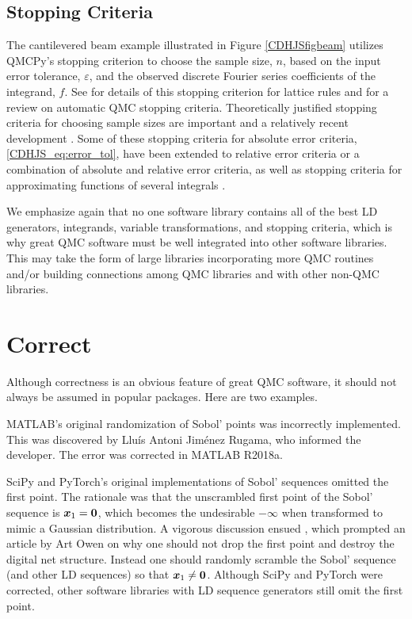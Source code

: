 \documentclass[graybox]{svmult}
\begin{document}
\subsection{Stopping Criteria}
The cantilevered beam example illustrated in Figure \ref{CDHJSfigbeam} utilizes QMCPy's stopping criterion to choose the sample size, $n$, based on the input error tolerance, $\varepsilon$, and the observed discrete Fourier series coefficients of the integrand, $f$.  See \cite{HicJim16a} for details of this stopping criterion for lattice rules and \cite{HicEtal18a} for a review on automatic QMC stopping criteria.  Theoretically justified stopping criteria for choosing sample sizes are important and a relatively recent development \cite{HicEtal14a,HicJim16a,JimHic16a,RatHic19a,JagHic22a}.  Some of these stopping criteria for absolute error criteria, \eqref{CDHJS_eq:error_tol},  have been extended to relative error criteria or a combination of absolute and relative error criteria, as well as stopping criteria for approximating functions of several integrals \cite{Jia16a,GilJim16b,HicEtal17a,JagSor23a}.

We emphasize again that no one software library contains all of the best LD generators, integrands, variable transformations, and stopping criteria, which is why great QMC software must be well integrated into other software libraries.  This may take the form of large libraries incorporating more QMC routines and/or building connections among QMC libraries and with other non-QMC libraries.


\section{Correct} \label{CDHJS_sec:correct}
Although correctness is an obvious feature of great QMC software, it should not always be assumed in popular packages.  Here are two examples.

MATLAB's original randomization of Sobol' points was incorrectly implemented.  This was discovered by Llu\'is Antoni Jim\'enez Rugama, who informed the developer.  The error was corrected in MATLAB R2018a.

SciPy and PyTorch's original implementations of Sobol' sequences omitted the first point.  The rationale was that the unscrambled first point of the Sobol' sequence is ${\boldsymbol{x}}_1 = {\boldsymbol{0}}$, which becomes the undesirable $\boldsymbol{-\infty}$ when transformed to mimic a Gaussian distribution.  A vigorous discussion ensued \cite{scipySobol2020a,pytorchSoboldiscussion2020a}, which prompted an article by Art Owen \cite{Owe22a} on why one should not drop the first point and destroy the digital net structure.  Instead one should randomly scramble the Sobol' sequence (and other LD sequences) so that ${\boldsymbol{x}}_1 \ne {\boldsymbol{0}}$.  Although SciPy and PyTorch were corrected, other software libraries with LD sequence generators still omit the first point.
\end{document}
